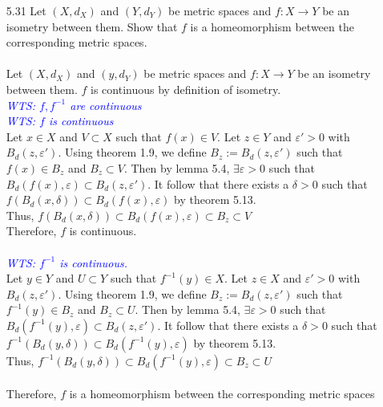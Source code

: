 \documentclass[12pt]{article}
\newcommand{\wts}[1]{\textit{\textcolor{blue}{WTS: #1}}\\}
\newcommand{\1}{^{-1}}
\begin{document}
\begin{enumerate}
		\item[5.31] Let $\left(X, d_{X}\right)$ and $\left(Y, d_{Y}\right)$ be metric spaces and $f: X \rightarrow Y$ be an isometry between them. Show that $f$ is a homeomorphism between the corresponding metric spaces.\\
		\\
		Let $ (X,d_X) $ and $ (y,d_Y) $ be metric spaces and $ f : X \to Y $ be an isometry between them. $ f $ is continuous by definition of isometry.\\
		\wts{$ f,f\1 $ are continuous}
		\wts{$ f $ is continuous}
		Let $ x\in X $ and $ V\subset X $ such that $ f(x)\in V $. Let $ z\in Y $ and $ \varepsilon'>0 $ with $ B_d(z,\varepsilon') $. Using theorem 1.9, we define $ B_z := B_d(z,\varepsilon') $ such that $ f(x) \in B_z $ and $ B_z \subset V $. Then by lemma 5.4, $ \exists \varepsilon >0$ such that $ B_d(f(x),\varepsilon)\subset B_d(z,\varepsilon') $. It follow that there exists a $ \delta > 0  $ such that $ f(B_d(x,\delta))\subset B_d(f(x),\varepsilon) $ by theorem 5.13.\\
		Thus, $ f(B_d(x,\delta))\subset B_d(f(x),\varepsilon) \subset B_z \subset V$\\
		Therefore, $ f $ is continuous.\\
		\\
		\wts{$ f\1 $ is continuous.}
		Let $ y\in Y $ and $ U\subset Y $ such that $ f\1(y)\in X $. Let $ z\in X $ and $ \varepsilon'>0 $ with $ B_d(z,\varepsilon') $. Using theorem 1.9, we define $ B_z := B_d(z,\varepsilon') $ such that $ f\1(y) \in B_z $ and $ B_z \subset U $. Then by lemma 5.4, $ \exists \varepsilon >0$ such that $ B_d(f\1(y),\varepsilon)\subset B_d(z,\varepsilon') $. It follow that there exists a $ \delta > 0  $ such that $ f\1(B_d(y,\delta))\subset B_d(f\1(y),\varepsilon) $ by theorem 5.13.\\
		Thus, $ f\1(B_d(y,\delta))\subset B_d(f\1(y),\varepsilon) \subset B_z \subset U$\\
		\\
		Therefore, $f$ is a homeomorphism between the corresponding metric spaces
		
		
		
		
		
	\end{enumerate}
\end{document}
